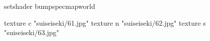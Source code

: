 setshader bumpspecmapworld

    texture c "suiseiseki/61.jpg"
    texture n "suiseiseki/62.jpg"
    texture s "suiseiseki/63.jpg"
